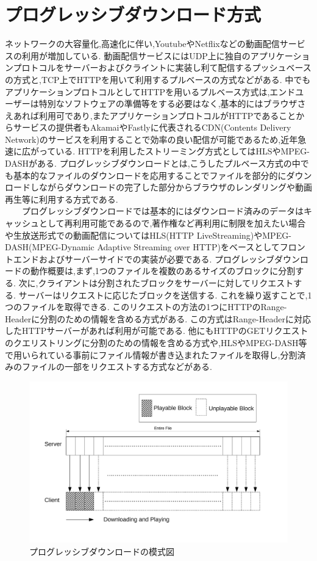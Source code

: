 \documentclass[a4j,12pt]{gradthesis_utf8}
\begin{document}
\section{プログレッシブダウンロード方式}
ネットワークの大容量化,高速化に伴い,Youtube\cite{youtube}やNetflix\cite{netflix}などの動画配信サービスの利用が増加している.
動画配信サービスにはUDP上に独自のアプリケーションプロトコルをサーバーおよびクライントに実装し利て配信するプッシュベースの方式と,TCP上でHTTPを用いて利用するプルベースの方式などがある.
中でもアプリケーションプロトコルとしてHTTPを用いるプルベース方式は,エンドユーザーは特別なソフトウェアの準備等をする必要はなく,基本的にはブラウザさえあれば利用可であり,またアプリケーションプロトコルがHTTPであることからサービスの提供者もAkamaiやFastlyに代表されるCDN(Contents Delivery Network)のサービスを利用することで効率の良い配信が可能であるため,近年急速に広がっている.
HTTPを利用したストリーミング方式としてはHLSやMPEG-DASHがある.
プログレッシブダウンロードとは,こうしたプルベース方式の中でも基本的なファイルのダウンロードを応用することでファイルを部分的にダウンロードしながらダウンロードの完了した部分からブラウザのレンダリングや動画再生等に利用する方式である.\\
\ \ \ \ プログレッシブダウンロードでは基本的にはダウンロード済みのデータはキャッシュとして再利用可能であるので,著作権など再利用に制限を加えたい場合や生放送形式での動画配信についてはHLS(HTTP LiveStreaming)\cite{hls}やMPEG-DASH(MPEG-Dynamic Adaptive Streaming over HTTP)\cite{dash}をベースとしてフロントエンドおよびサーバーサイドでの実装が必要である.
プログレッシブダウンロードの動作概要は,まず,1つのファイルを複数のあるサイズのブロックに分割する.
次に,クライアントは分割されたブロックをサーバーに対してリクエストする.
サーバーはリクエストに応じたブロックを送信する.
これを繰り返すことで,1つのファイルを取得できる.
このリクエストの方法の1つにHTTPのRange-Headerに分割のための情報を含める方式がある.
この方式はRange-Headerに対応したHTTPサーバーがあれば利用が可能である.
他にもHTTPのGETリクエストのクエリストリングに分割のための情報を含める方式や,HLSやMPEG-DASH等で用いられている事前にファイル情報が書き込まれたファイルを取得し,分割済みのファイルの一部をリクエストする方式などがある.

\begin{figure}[h]
	\centering
	\includegraphics[width=16cm]{figure/p-dl.pdf}
	\caption{プログレッシブダウンロードの模式図}
	\label{p-dl}
\end{figure}
\end{document}
